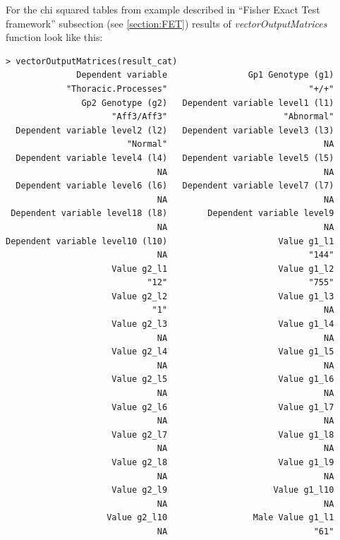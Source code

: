 \documentclass[12pt,a4paper]{article}
\begin{document}
For the chi squared tables from example described in ``Fisher Exact Test framework'' subsection (see \ref{section:FET}) results of \textit{vectorOutputMatrices} function look like this:


\begingroup
    \fontsize{8pt}{12pt}\selectfont
\begin{verbatim}
> vectorOutputMatrices(result_cat)
              Dependent variable                Gp1 Genotype (g1) 
            "Thoracic.Processes"                            "+/+" 
               Gp2 Genotype (g2)   Dependent variable level1 (l1) 
                     "Aff3/Aff3"                       "Abnormal" 
  Dependent variable level2 (l2)   Dependent variable level3 (l3) 
                        "Normal"                               NA 
  Dependent variable level4 (l4)   Dependent variable level5 (l5) 
                              NA                               NA 
  Dependent variable level6 (l6)   Dependent variable level7 (l7) 
                              NA                               NA 
 Dependent variable level18 (l8)        Dependent variable level9 
                              NA                               NA 
Dependent variable level10 (l10)                      Value g1_l1 
                              NA                            "144" 
                     Value g2_l1                      Value g1_l2 
                            "12"                            "755" 
                     Value g2_l2                      Value g1_l3 
                             "1"                               NA 
                     Value g2_l3                      Value g1_l4 
                              NA                               NA 
                     Value g2_l4                      Value g1_l5 
                              NA                               NA 
                     Value g2_l5                      Value g1_l6 
                              NA                               NA 
                     Value g2_l6                      Value g1_l7 
                              NA                               NA 
                     Value g2_l7                      Value g1_l8 
                              NA                               NA 
                     Value g2_l8                      Value g1_l9 
                              NA                               NA 
                     Value g2_l9                     Value g1_l10 
                              NA                               NA 
                    Value g2_l10                 Male Value g1_l1 
                              NA                             "61" 

\end{verbatim}
\end{document}
